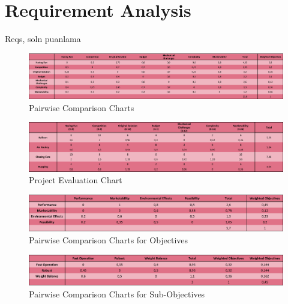 \documentclass[a4paper,12pt]{article}
\begin{document}
\section{Requirement Analysis}
	Reqs, soln puanlama

	\begin{figure}[H]
		\centering
		\includegraphics[width=\textwidth,height=\textheight,keepaspectratio]{images/objective_tree} 
		\caption{\label{fig:pairwise_comp}Pairwise Comparison Charts}
	\end{figure}
	
	\begin{figure}[H]
		\centering
		\includegraphics[width=\textwidth,height=\textheight,keepaspectratio]{images/project_evaluation} 
		\caption{\label{fig:project_eval}Project Evaluation Chart}
	\end{figure}
	
	
	
	

	
	\begin{figure}[H]
		\centering
		\includegraphics[width=\textwidth,height=\textheight,keepaspectratio]{images/proje_objective_tree} 
		\caption{\label{fig:project_objective_tree}Pairwise Comparison Charts for Objectives}
	\end{figure}	
	
	\begin{figure}[H]
		\centering
		\includegraphics[width=\textwidth,height=\textheight,keepaspectratio]{images/proje_objective_tree_2} 
		\caption{\label{fig:sub_project_objective_tree}Pairwise Comparison Charts for Sub-Objectives}
	\end{figure}	
	
\end{document}

